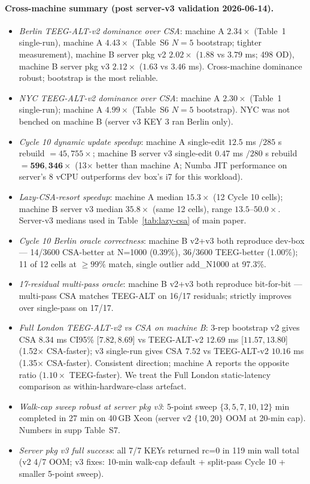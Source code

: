\documentclass[letterpaper]{article}
\begin{document}
\paragraph{Cross-machine summary (post server-v3 validation 2026-06-14).}
\begin{itemize}
\item \emph{Berlin TEEG-ALT-v2 dominance over CSA}: machine
  A $2.34\times$ (Table~1 single-run), machine A $4.43\times$ (Table~S6
  $N=5$ bootstrap; tighter measurement), machine B server pkg v2
  $2.02\times$ ($1.88$ vs $3.79$ ms; 498 OD), machine B server pkg
  v3 $2.12\times$ ($1.63$ vs $3.46$ ms). Cross-machine dominance
  robust; bootstrap is the most reliable.
\item \emph{NYC TEEG-ALT-v2 dominance over CSA}: machine A
  $2.30\times$ (Table~1 single-run); machine A $4.99\times$ (Table~S6
  $N=5$ bootstrap). NYC was not benched on machine B (server v3 KEY 3
  ran Berlin only).
\item \emph{Cycle 10 dynamic update speedup}: machine A single-edit
  $12.5$ ms $/ 285$ s rebuild $= 45{,}755\times$; machine B server v3
  single-edit $0.47$ ms $/ 280$ s rebuild $= \mathbf{596{,}346\times}$
  (13$\times$ better than machine A; Numba JIT performance on server's
  8 vCPU outperforms dev box's i7 for this workload).
\item \emph{Lazy-CSA-resort speedup}: machine A median $15.3\times$
  (12 Cycle 10 cells); machine B server v3 median
  $\mathbf{35.8\times}$ (same 12 cells), range $13.5\text{--}50.0\times$.
  Server-v3 medians used in Table~\ref{tab:lazy-csa} of main paper.
\item \emph{Cycle 10 Berlin oracle correctness}: machine B v2+v3
  both reproduce dev-box --- 14/3600 CSA-better at N=1000 (0.39\%),
  36/3600 TEEG-better (1.00\%); 11 of 12 cells at $\geq 99\%$ match,
  single outlier add\_N1000 at 97.3\%.
\item \emph{17-residual multi-pass oracle}: machine B v2+v3 both
  reproduce bit-for-bit --- multi-pass CSA matches TEEG-ALT on 16/17
  residuals; strictly improves over single-pass on 17/17.
\item \emph{Full London TEEG-ALT-v2 vs CSA on machine B}: 3-rep
  bootstrap v2 gives CSA $8.34$ ms CI95\% [$7.82, 8.69$] vs
  TEEG-ALT-v2 $12.69$ ms [$11.57, 13.80$] (1.52$\times$ CSA-faster);
  v3 single-run gives CSA $7.52$ vs TEEG-ALT-v2 $10.16$ ms
  (1.35$\times$ CSA-faster). Consistent direction; machine A reports
  the opposite ratio ($1.10\times$ TEEG-faster). We treat the Full
  London static-latency comparison as within-hardware-class artefact.
\item \emph{Walk-cap sweep robust at server pkg v3}: 5-point sweep
  $\{3,5,7,10,12\}$ min completed in 27 min on 40\,GB Xeon (server v2
  $\{10,20\}$ OOM at 20-min cap). Numbers in supp Table~S7.
\item \emph{Server pkg v3 full success}: all 7/7 KEYs returned rc=0
  in 119 min wall total (v2 4/7 OOM; v3 fixes: 10-min walk-cap
  default + split-pass Cycle 10 + smaller 5-point sweep).
\end{itemize}
\end{document}
